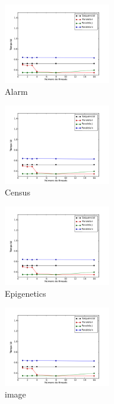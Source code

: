 	\begin{figure}[H]
		\centering
		\begin{subfigure}{.3\textwidth}
			\centering
			\includegraphics[height=3.5cm]{images/alarm}
			\caption{Alarm}
			\label{fig:alarm}
		\end{subfigure}
		\begin{subfigure}{.3\textwidth}
			\centering
			\includegraphics[height=3.5cm]{images/census}
			\caption{Census}
			\label{fig:census}
		\end{subfigure}
		\begin{subfigure}{.3\textwidth}
			\centering
			\includegraphics[height=3.5cm]{images/epigenetics}
			\caption{Epigenetics}
			\label{fig:epigenetics}
		\end{subfigure}
		\begin{subfigure}{.3\textwidth}
			\centering
			\includegraphics[height=3.5cm]{images/image}
			\caption{image}
			\label{fig:image}
		\end{subfigure}
		\begin{subfigure}{.3\textwidth}

\end{subfigure}
\end{figure}

